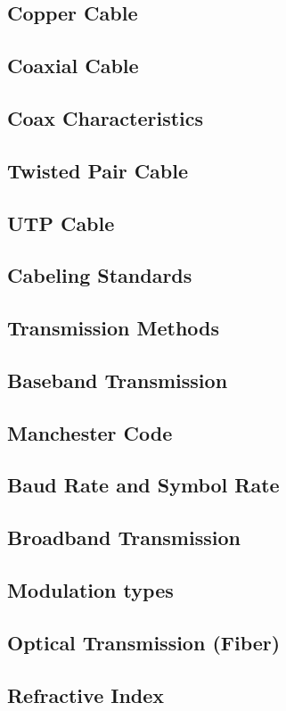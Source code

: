 \documentclass[11pt]{article}
\begin{document}
\subsection{Copper Cable}
\subsection{Coaxial Cable}
\subsection{Coax Characteristics}
\subsection{Twisted Pair Cable}
\subsection{UTP Cable}
\subsection{Cabeling Standards}
\subsection{Transmission Methods}
\subsection{Baseband Transmission}
\subsection{Manchester Code}
\subsection{Baud Rate and Symbol Rate}
\subsection{Broadband Transmission}
\subsection{Modulation types}
\subsection{Optical Transmission (Fiber)}
\subsection{Refractive Index}
\end{document}
